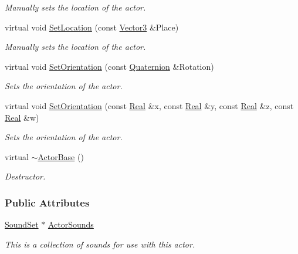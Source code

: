 \begin{DoxyCompactItemize}
\begin{DoxyCompactList}\small\item\em Manually sets the location of the actor. \item\end{DoxyCompactList}\item 
virtual void \hyperlink{classphys_1_1ActorBase_aa5b6dca6b4ac7bb7ae96ca0ce359ff38}{SetLocation} (const \hyperlink{classphys_1_1Vector3}{Vector3} \&Place)
\begin{DoxyCompactList}\small\item\em Manually sets the location of the actor. \item\end{DoxyCompactList}\item 
virtual void \hyperlink{classphys_1_1ActorBase_a17db5c39d6edd56fd062d9e50af2d9b0}{SetOrientation} (const \hyperlink{classphys_1_1Quaternion}{Quaternion} \&Rotation)
\begin{DoxyCompactList}\small\item\em Sets the orientation of the actor. \item\end{DoxyCompactList}\item 
virtual void \hyperlink{classphys_1_1ActorBase_a70c912b72a90d055aea450f18dbac3de}{SetOrientation} (const \hyperlink{namespacephys_af7eb897198d265b8e868f45240230d5f}{Real} \&x, const \hyperlink{namespacephys_af7eb897198d265b8e868f45240230d5f}{Real} \&y, const \hyperlink{namespacephys_af7eb897198d265b8e868f45240230d5f}{Real} \&z, const \hyperlink{namespacephys_af7eb897198d265b8e868f45240230d5f}{Real} \&w)
\begin{DoxyCompactList}\small\item\em Sets the orientation of the actor. \item\end{DoxyCompactList}\item 
virtual \hyperlink{classphys_1_1ActorBase_a5e5d4b50c83c6851e554b5e7ad65403f}{$\sim$ActorBase} ()
\begin{DoxyCompactList}\small\item\em Destructor. \item\end{DoxyCompactList}\end{DoxyCompactItemize}
\subsubsection*{Public Attributes}
\begin{DoxyCompactItemize}
\item 
\hypertarget{classphys_1_1ActorBase_a2d56e2b3470bfc7dfc6d9ce8c4158d81}{
\hyperlink{classphys_1_1SoundSet}{SoundSet} $\ast$ \hyperlink{classphys_1_1ActorBase_a2d56e2b3470bfc7dfc6d9ce8c4158d81}{ActorSounds}}
\label{classphys_1_1ActorBase_a2d56e2b3470bfc7dfc6d9ce8c4158d81}

\begin{DoxyCompactList}\small\item\em This is a collection of sounds for use with this actor. \item\end{DoxyCompactList}\end{DoxyCompactItemize}
